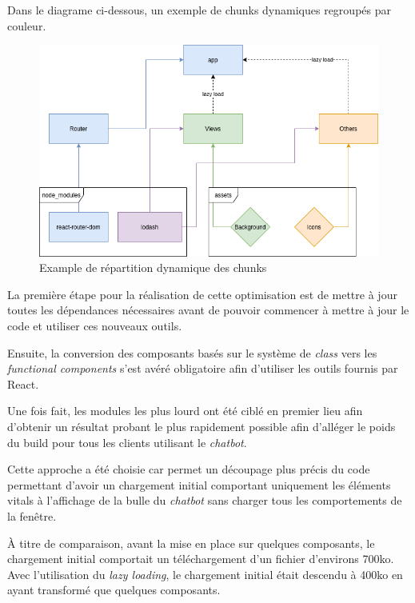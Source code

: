 \documentclass[12pt,a4paper,oneside]{scrreprt}
\begin{document}
Dans le diagrame ci-dessous, un exemple de chunks dynamiques regroupés par couleur.

\begin{figure}[!ht]
	\centering
	\includegraphics[width=\textwidth]{pictures/dynamics_imports.png}
	\caption{Example de répartition dynamique des chunks}
\end{figure}

\begin{info}
	La première étape pour la réalisation de cette optimisation est de mettre à jour toutes les dépendances nécessaires avant de pouvoir commencer à mettre à jour le code et utiliser ces nouveaux outils.

	Ensuite, la conversion des composants basés sur le système de \textit{class} vers les \textit{functional components} s'est avéré obligatoire afin d'utiliser les outils fournis par React.

	Une fois fait, les modules les plus lourd ont été ciblé en premier lieu afin d'obtenir un résultat probant le plus rapidement possible afin d'alléger le poids du build pour tous les clients utilisant le \textit{chatbot}.
\end{info}

\begin{result}
	Cette approche a été choisie car permet un découpage plus précis du code permettant d'avoir un chargement initial comportant uniquement les éléments vitals à l'affichage de la bulle du \textit{chatbot} sans charger tous les comportements de la fenêtre.

	À titre de comparaison, avant la mise en place sur quelques composants, le chargement initial comportait un téléchargement d'un fichier d'environs 700ko. Avec l'utilisation du \textit{lazy loading}, le chargement initial était descendu à 400ko en ayant transformé que quelques composants.
\end{result}
\end{document}
